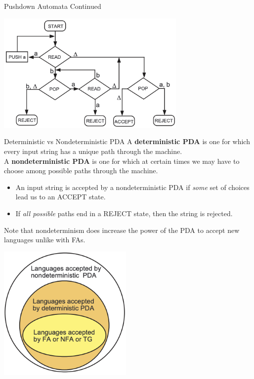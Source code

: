 \documentclass{article}
\begin{document}
\begin{multicols*}{3}
\begin{blackbox}{Pushdown Automata Continued}
\begin{center}
        \includegraphics[width=0.69\textwidth]{pda.png}
    \end{center}
        \begin{bluebox}{Deterministic vs Nondeterministic PDA}
        A \textbf{deterministic PDA} is one for which every input string has a unique path through the machine.\\
        A \textbf{nondeterministic PDA} is one for which at certain times we may have to choose among possible paths through the machine.
        \begin{itemize}[leftmargin=5pt]
            \item An input string is accepted by a nondeterministic PDA if \emph{some} set of choices lead us to an ACCEPT state.
            \item If \emph{all possible} paths end in a REJECT state, then the string is rejected.
        \end{itemize}
        \begin{multicols*}{2}
            Note that nondeterminism does increase the power of the PDA to accept new languages unlike with FAs.
            \begin{center}
                \includegraphics[width=0.49\textwidth]{circles.png}
            \end{center}
        \end{multicols*}

\end{bluebox}
\end{blackbox}
\end{multicols*}
\end{document}
